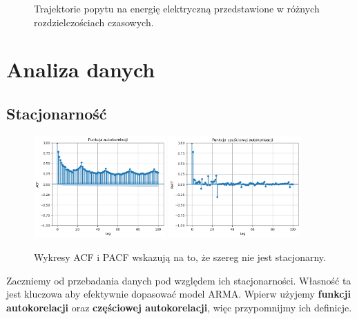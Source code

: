 \documentclass[11pt]{article}
\begin{document}
\begin{figure}[h!]
\begin{minipage}[b]{0.45\textwidth}
    \end{minipage}
	\caption{Trajektorie popytu na energię elektryczną przedstawione w różnych rozdzielczościach czasowych.}
	\label{fig:trajektorie}
\end{figure}


\section{Analiza danych}

\subsection{Stacjonarność}

\begin{figure}[h!]

	\centering
	\includegraphics[width=0.45\textwidth]{../plots/acf_niezmodyfikowane.png}
	\hfill
	\includegraphics[width=0.45\textwidth]{../plots/pacf_niezmodyfikowane.png}
	\caption{Wykresy ACF i PACF wskazują na to, że szereg nie jest stacjonarny.}
	\label{fig:acf_pacf_niezmodyfikowane}

\end{figure}

Zaczniemy od przebadania danych pod względem ich stacjonarności. Własność ta jest kluczowa aby efektywnie dopasować model ARMA. Wpierw użyjemy \textbf{funkcji autokorelacji} oraz \textbf{częściowej autokorelacji}, więc przypomnijmy ich definicje. \\
\end{document}
